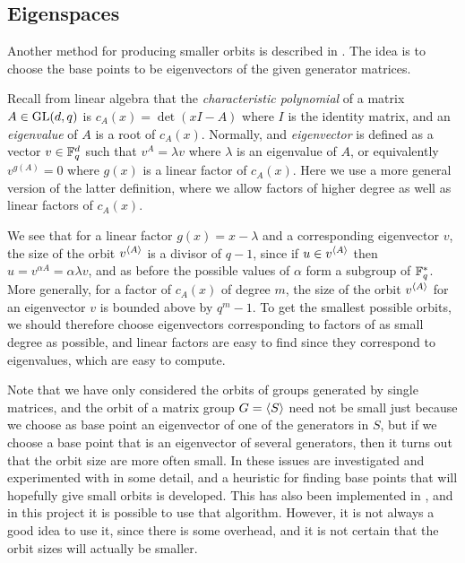 \subsection{Eigenspaces}
Another method for producing smaller orbits is described in \cite{murray95}. The idea is to choose the base points to be eigenvectors of the given generator matrices.

Recall from linear algebra that the \emph{characteristic polynomial}
of a matrix $A \in \operatorname{GL} (d, q)$ is $c_A(x) = \det (xI - A)$ where $I$
is the identity matrix, and an \emph{eigenvalue} of $A$ is a root of
$c_A(x)$.  Normally, and \emph{eigenvector} is defined as a vector $v
\in \mathbb{F}_q^d$ such that $v^A = \lambda v$ where $\lambda$ is an
eigenvalue of $A$, or equivalently $v^{g(A)} = 0$ where $g(x)$ is a
linear factor of $c_A(x)$. Here we use a more general version of the
latter definition, where we allow factors of higher degree as well as
linear factors of $c_A(x)$.

We see that for a linear factor $g(x) = x - \lambda$ and a
corresponding eigenvector $v$, the size of the orbit $v^{\left\langle A \right\rangle}$ is
a divisor of $q - 1$, since if $u \in v^{\left\langle A \right\rangle}$ then $u = v^{\alpha
  A} = \alpha \lambda v$, and as before the possible values of
$\alpha$ form a subgroup of $\mathbb{F}_q^{*}$. More generally, for a factor
of $c_A(x)$ of degree $m$, the size of the orbit $v^{\left\langle A \right\rangle}$ for an
eigenvector $v$ is bounded above by $q^m - 1$. To get the smallest
possible orbits, we should therefore choose eigenvectors corresponding
to factors of as small degree as possible, and linear factors are easy
to find since they correspond to eigenvalues, which are easy to
compute.

Note that we have only considered the orbits of groups generated by
single matrices, and the orbit of a matrix group $G = \left\langle S \right\rangle$ need
not be small just because we choose as base point an eigenvector of
one of the generators in $S$, but if we choose a base point that is an
eigenvector of several generators, then it turns out that the orbit
size are more often small. In \cite{murray95} these issues are
investigated and experimented with in some detail, and a heuristic for
finding base points that will hopefully give small orbits is
developed. This has also been implemented in \GAP, and in this project
it is possible to use that algorithm. However, it is not always a good
idea to use it, since there is some overhead, and it is not certain
that the orbit sizes will actually be smaller.
